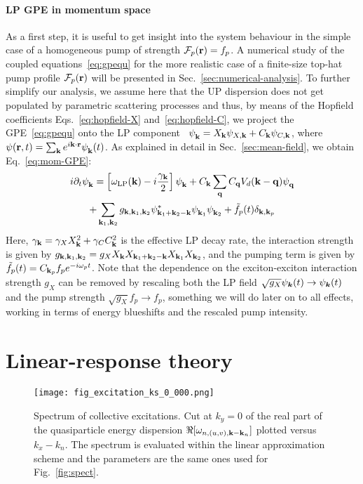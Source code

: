 \paragraph{LP GPE in momentum space}
As a first step, it is useful to get insight into the system behaviour
in the simple case of a homogeneous pump of strength
$\mathcal{F}_p(\mathbf{r}) = f_p$. A numerical study of the coupled
equations~\eqref{eq:gpequ} for the more realistic case of a
finite-size top-hat pump profile $\mathcal{F}_p(\mathbf{r})$ will be
presented in Sec.~\ref{sec:numerical-analysis}.
%
To further simplify our analysis, we assume here that the UP
dispersion does not get populated by parametric scattering processes
and thus, by means of the Hopfield coefficients
Eqs.~\eqref{eq:hopfield-X} and~\eqref{eq:hopfield-C}, we project the
GPE~\eqref{eq:gpequ} onto the LP
component~\cite{Ciuti_2001,Wouters_2007_b}
$\psi_{\mathbf{k}}^{} = X_{\mathbf{k}} \psi_{X,\mathbf{k}} + C_{\mathbf{k}}
\psi_{C,\mathbf{k}}$, where
$\psi(\mathbf{r},t) = \sum_{\mathbf{k}} e^{i\mathbf{k}\cdot \mathbf{r}}
\psi_{\mathbf{k}}^{} (t)$. As explained in detail in
Sec.~\ref{sec:mean-field}, we obtain Eq.~\eqref{eq:mom-GPE}:
%
\begin{multline}
  i\partial_t \psi_{\mathbf{k}}^{} = \left[\omega_{\text{LP}}({\mathbf{k}}) -
    i\frac{\gamma_{\mathbf{k}}}{2}\right]\psi_{\mathbf{k}}^{} +
  C_{\mathbf{k}} \sum_{\mathbf{q}} C_{\mathbf{q}} V_d(\mathbf{k} - \mathbf{q})
  \psi_{\mathbf{q}}^{}\\ + \sum_{\mathbf{k}_1, \mathbf{k}_2} g_{\mathbf{k},
    \mathbf{k}_1, \mathbf{k}_2} \psi^*_{\mathbf{k}_1 + \mathbf{k}_2-\mathbf{k}}
  \psi_{\mathbf{k}_1}^{} \psi_{\mathbf{k}_2}^{} + \tilde{f}_p(t)
  \delta_{\mathbf{k},\mathbf{k}_p}
\label{eq:efflp}
\end{multline}
%
Here, $\gamma_{\mathbf{k}}=\gamma_X X_{\mathbf{k}}^2 + \gamma_C C_{\mathbf{k}}^2$
is the effective LP decay rate, the interaction strength is given by
$g_{\mathbf{k}, \mathbf{k}_1, \mathbf{k}_2}=g_X X_{\mathbf{k}} X_{\mathbf{k}_1 +
  \mathbf{k}_2-\mathbf{k}} X_{\mathbf{k}_1} X_{\mathbf{k}_2}$, and the pumping term is
given by $\tilde{f}_p(t)= C_{\mathbf{k}_p} f_p e^{-i\omega_p t}$. Note
that the dependence on the exciton-exciton interaction strength $g_X$
can be removed by rescaling both the LP field
$\sqrt{g_X}\psi_{\bm{k}}(t) \rightarrow \psi_{\bm{k}}(t)$ and the pump
strength $\sqrt{g_X}f_p \rightarrow f_p$, something we will do later
on to all effects, working in terms of energy blueshifts and the
rescaled pump intensity.


\section{Linear-response theory}
\label{sec:line-resp-theory}
%
\begin{figure}[tb]\centering
\texttt{[image: fig\_excitation\_ks\_0\_000.png]}
\caption{Spectrum of collective excitations. Cut at $k_y=0$ of the
  real part of the quasiparticle energy dispersion
  $\Re [\omega_{n,(u,v),\mathbf{k}-\mathbf{k}_n}]$ plotted versus $k_x -
  k_n$. The spectrum is evaluated within the linear approximation
  scheme and the parameters are the same ones used for
  Fig.~\ref{fig:spect}.}
\label{fig:bogol}
\end{figure}
%

